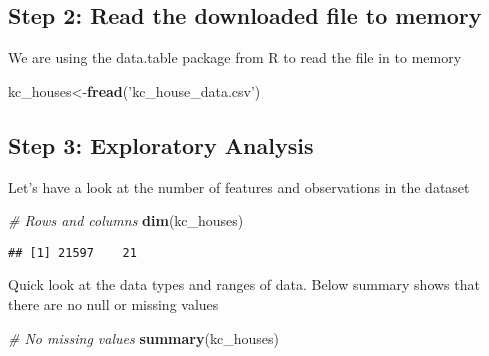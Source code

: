 \documentclass[]{article}
\newenvironment{Shaded}{\begin{snugshade}}{\end{snugshade}}
\newcommand{\CommentTok}[1]{\textcolor[rgb]{0.56,0.35,0.01}{\textit{#1}}}
\newcommand{\KeywordTok}[1]{\textcolor[rgb]{0.13,0.29,0.53}{\textbf{#1}}}
\newcommand{\NormalTok}[1]{#1}
\newcommand{\StringTok}[1]{\textcolor[rgb]{0.31,0.60,0.02}{#1}}
\begin{document}
\hypertarget{step-2-read-the-downloaded-file-to-memory}{%
\subsection{Step 2: Read the downloaded file to
memory}\label{step-2-read-the-downloaded-file-to-memory}}

We are using the data.table package from R to read the file in to memory

\begin{Shaded}
\begin{Highlighting}[]
\NormalTok{kc_houses<-}\KeywordTok{fread}\NormalTok{(}\StringTok{'kc_house_data.csv'}\NormalTok{)}
\end{Highlighting}
\end{Shaded}

\hypertarget{step-3-exploratory-analysis}{%
\subsection{Step 3: Exploratory
Analysis}\label{step-3-exploratory-analysis}}

Let's have a look at the number of features and observations in the
dataset

\begin{Shaded}
\begin{Highlighting}[]
\CommentTok{# Rows and columns}
\KeywordTok{dim}\NormalTok{(kc_houses)}
\end{Highlighting}
\end{Shaded}

\begin{verbatim}
## [1] 21597    21
\end{verbatim}

Quick look at the data types and ranges of data. Below summary shows
that there are no null or missing values

\begin{Shaded}
\begin{Highlighting}[]
\CommentTok{# No missing values}
\KeywordTok{summary}\NormalTok{(kc_houses)}
\end{Highlighting}
\end{Shaded}
\end{document}
